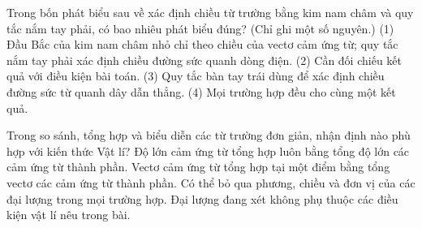 \begin{ex}
Trong bốn phát biểu sau về xác định chiều từ trường bằng kim nam châm và quy tắc nắm tay phải, có bao nhiêu phát biểu đúng? (Chỉ ghi một số nguyên.) (1) Đầu Bắc của kim nam châm nhỏ chỉ theo chiều của vectơ cảm ứng từ; quy tắc nắm tay phải xác định chiều đường sức quanh dòng điện. (2) Cần đối chiếu kết quả với điều kiện bài toán. (3) Quy tắc bàn tay trái dùng để xác định chiều đường sức từ quanh dây dẫn thẳng. (4) Mọi trường hợp đều cho cùng một kết quả.
\end{ex}

\begin{ex}
Trong so sánh, tổng hợp và biểu diễn các từ trường đơn giản, nhận định nào phù hợp với kiến thức Vật lí?
\choice
{Độ lớn cảm ứng từ tổng hợp luôn bằng tổng độ lớn các cảm ứng từ thành phần.}
{\True Vectơ cảm ứng từ tổng hợp tại một điểm bằng tổng vectơ các cảm ứng từ thành phần.}
{Có thể bỏ qua phương, chiều và đơn vị của các đại lượng trong mọi trường hợp.}
{Đại lượng đang xét không phụ thuộc các điều kiện vật lí nêu trong bài.}
\end{ex}


